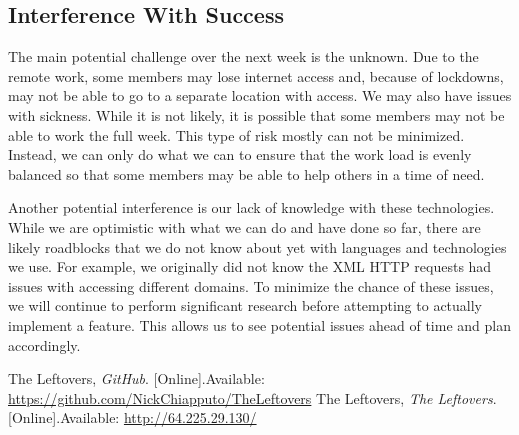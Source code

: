 \documentclass[12pt]{article}
\begin{document}
		\subsection{Interference With Success}
			The main potential challenge over the next week is the unknown. Due to the remote work, some members may lose internet access and, because of lockdowns, may not be able to go to a separate location with access. We may also have issues with sickness. While it is not likely, it is possible that some members may not be able to work the full week. This type of risk mostly can not be minimized. Instead, we can only do what we can to ensure that the work load is evenly balanced so that some members may be able to help others in a time of need.

			Another potential interference is our lack of knowledge with these technologies. While we are optimistic with what we can do and have done so far, there are likely roadblocks that we do not know about yet with languages and technologies we use. For example, we originally did not know the XML HTTP requests had issues with accessing different domains. To minimize the chance of these issues, we will continue to perform significant research before attempting to actually implement a feature. This allows us to see potential issues ahead of time and plan accordingly.

	\begin{thebibliography}{00}
		 The Leftovers, \textit{GitHub}. [Online].Available: \url{https://github.com/NickChiapputo/TheLeftovers}
		 The Leftovers, \textit{The Leftovers}. [Online].Available: \url{http://64.225.29.130/}
	\end{thebibliography}
\end{document}
